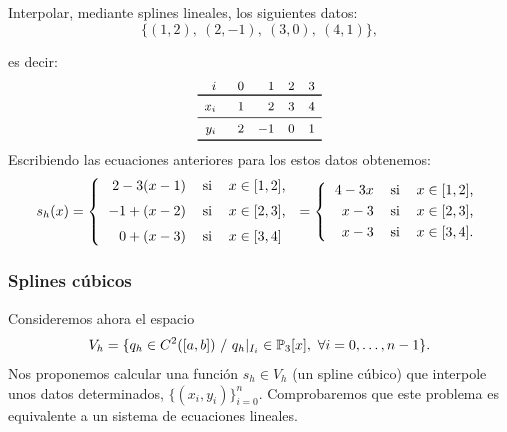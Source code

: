 \begin{example}
  \label{ex:splines-lineales-1}
  Interpolar, mediante splines lineales, los siguientes
  datos:
  \begin{equation*}
    \{ (1,2),\ (2,-1),\ (3,0),\ (4,1) \},
  \end{equation*}
\end{example}
es decir:
\begin{equation*}
  \small
  \begin{array}{r@{\rule{4ex}{0pt}}rrrcr}
    i & 0 & 1 & 2 & 3 
    \\ \toprule %
    x_i & 1 & 2 & 3 & 4
    \\ \midrule
    y_i & 2 & -1 & 0  & 1
    \\
    \bottomrule
  \end{array}
  \label{eq:tabla-datos-lagrange}
\end{equation*}
Escribiendo las ecuaciones anteriores para los
estos datos obtenemos:
\begin{equation*}
  s_h(x)=\left\{
    \begin{tabular}{rll}
      $2 -3 (x-1)$ & si & $x\in[1,2]$,
      \\\noalign{\medskip}
      $-1 + (x-2)$ & si & $x\in[2,3]$,
      \\\noalign{\medskip}
      $0 + (x-3)$ & si & $x\in[3,4]$
    \end{tabular} \right.
  =\left\{
    \begin{tabular}{rll}
      $4 -3x$ & si & $x\in[1,2]$,
      \\\noalign{\smallskip}
      $x-3$ & si & $x\in[2,3]$,
      \\\noalign{\smallskip}
      $x-3$ & si & $x\in[3,4]$.
    \end{tabular} \right.
\end{equation*}

\subsubsection{Splines cúbicos}
\label{sec:splines-lineales}

Consideremos ahora el espacio
\begin{equation*} V_h = \{q_h \in C^{2}([a,b])\ / \ q_h|_{I_i}\in
\operatorname{{\mathbb P}}_3[x],\ \forall i=0,\dots,n-1\}.
\end{equation*} Nos proponemos calcular una función $s_h\in V_h$ (un
spline cúbico) que interpole unos datos determinados,
$\{(x_i,y_i)\}_{i=0}^n$. Comprobaremos que este problema es
equivalente a un sistema de ecuaciones lineales.

